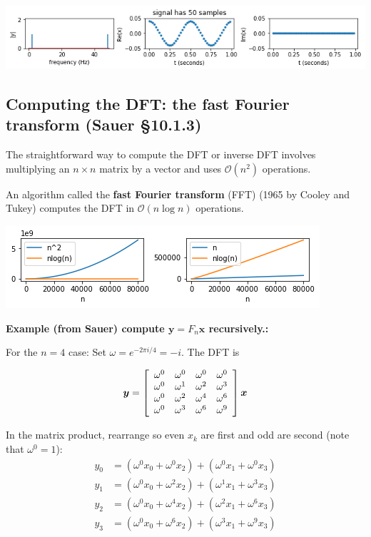 \documentclass[12pt,letterpaper,noanswers]{exam}
\newcommand{\vc}[1]{\boldsymbol{#1}}
\begin{document}
\includegraphics[width=0.9\linewidth]{img/C21ex2.png}



\subsection*{Computing the DFT: the fast Fourier transform (Sauer \S 10.1.3)}

\begin{tcolorbox}
The straightforward way to compute the DFT or inverse DFT involves multiplying an $n\times n$ matrix by a vector and uses $\mathcal{O}(n^2)$ operations.

An algorithm called the \textbf{fast Fourier transform} (FFT) (1965 by Cooley and Tukey) computes the DFT in $\mathcal{O}(n\log n)$ operations.
\end{tcolorbox}

\includegraphics[width=0.7\linewidth]{img/C21dfttime.png}

\noindent\textbf{Example (from Sauer) compute $\vc{y} = F_n \vc{x}$ recursively.:}

  For the $n=4$ case: Set $\omega = e^{-2\pi i/4} = -i$. The DFT is

 \[\vc{y} = \left[\begin{array}{l l l l} \omega^0 & \omega^0 & \omega^0 & \omega^0 \\
\omega^0 & \omega^{1} & \omega^{2} & \omega^{3} \\
\omega^0 & \omega^{2} & \omega^{4} & \omega^{6} \\
\omega^0 & \omega^{3} & \omega^{6} & \omega^{9} \\
\end{array}\right]\vc{x}\]

\noindent In the matrix product, rearrange so even $x_k$ are first and odd are second (note that $\omega^0 = 1$):
\begin{align*}
y_0 &= (\omega^0x_0 + \omega^0x_2) + (\omega^0x_1+\omega^0x_3) \\
y_1 &= (\omega^0x_0 + \omega^2x_2) + (\omega^1x_1+\omega^3x_3) \\
y_2 &= (\omega^0x_0 + \omega^4x_2) + (\omega^2x_1+\omega^6x_3) \\
y_3 &= (\omega^0x_0 + \omega^6x_2) + (\omega^3x_1+\omega^9x_3) \\
\end{align*}
\end{document}
